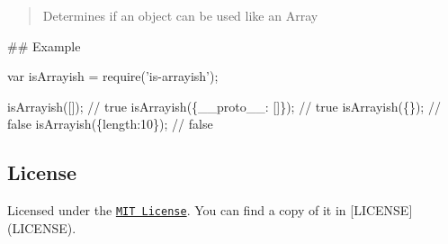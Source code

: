 \begin{quote}
Determines if an object can be used like an Array \end{quote}


\#\# Example 
\begin{DoxyCode}
var isArrayish = require('is-arrayish');

isArrayish([]); // true
isArrayish(\{\_\_proto\_\_: []\}); // true
isArrayish(\{\}); // false
isArrayish(\{length:10\}); // false
\end{DoxyCode}


\subsection*{License}

Licensed under the \href{http://opensource.org/licenses/MIT}{\tt M\+IT License}. You can find a copy of it in \mbox{[}L\+I\+C\+E\+N\+SE\mbox{]}(L\+I\+C\+E\+N\+SE). 